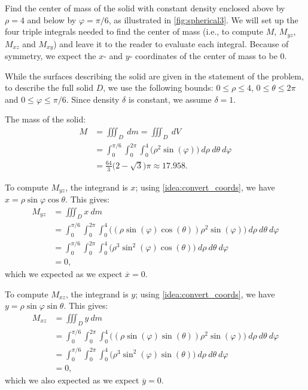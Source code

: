 \begin{example}\label{ex_spherical3}
Find the center of mass of the solid with constant density enclosed above by $\rho=4$ and below by $\varphi = \pi/6$, as illustrated in \autoref{fig:spherical3}.
\solution
We will set up the four triple integrals needed to find the center of mass (i.e., to compute $M$, $M_{yz}$, $M_{xz}$ and $M_{xy}$) and leave it to the reader to evaluate each integral. Because of symmetry, we expect the $x$- and $y$- coordinates of the center of mass to be 0.

While the surfaces describing the solid are given in the statement of the problem, to describe the full solid $D$, we use the following bounds: $0 \leq \rho \leq 4$, $0 \leq \theta \leq 2\pi$ and $0 \leq \varphi \leq \pi/6$. Since density $\delta$ is constant, we assume $\delta =1$.

The mass of the solid:
\begin{align*}
M &= \iiint_D\ dm = \iiint_D\ dV\\
	&= \int_0^{\pi/6}\int_0^{2\pi}\int_0^4\bigl(\rho^2\sin(\varphi)\bigr)\ d\rho\ d\theta\ d\varphi\\
	&= \frac{64}3\bigl(2-\sqrt{3}\bigr)\pi \approx 17.958.
\end{align*}

To compute $M_{yz}$, the integrand is $x$; using \autoref{idea:convert_coords}, we have $x = \rho\sin\varphi\cos\theta$. This gives:
\begin{align*}
M_{yz} &= \iiint_D x\ dm \\
	&= \int_0^{\pi/6}\int_0^{2\pi}\int_0^4 \bigl((\rho\sin(\varphi)\cos(\theta))\rho^2\sin(\varphi)\bigr) \ d\rho\ d\theta\ d\varphi\\
	&= \int_0^{\pi/6}\int_0^{2\pi}\int_0^4 \bigl(\rho^3\sin^2(\varphi)\cos(\theta)\bigr) \ d\rho\ d\theta\ d\varphi\\
	&=0,
\end{align*}
which we expected as we expect $\overline{x} = 0$.

To compute $M_{xz}$, the integrand is $y$; using \autoref{idea:convert_coords}, we have $y = \rho\sin\varphi\sin\theta$. This gives:
\begin{align*}
M_{xz} &= \iiint_D y\ dm \\
	&= \int_0^{\pi/6}\int_0^{2\pi}\int_0^4 \bigl((\rho\sin(\varphi)\sin(\theta))\rho^2\sin(\varphi)\bigr) \ d\rho\ d\theta\ d\varphi\\
	&= \int_0^{\pi/6}\int_0^{2\pi}\int_0^4 \bigl(\rho^3\sin^2(\varphi)\sin(\theta)\bigr) \ d\rho\ d\theta\ d\varphi\\
	&=0,
\end{align*}
which we also expected as we expect $\overline{y} = 0$.


\end{example}

